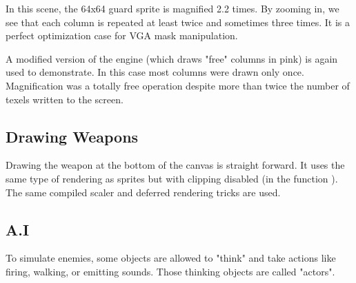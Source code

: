 \par
\begin{figure}[H]
 \centering
\end{figure}
In this scene, the 64x64 guard sprite is magnified 2.2 times. By zooming in, we see that each column is repeated at least twice and sometimes three times. It is a perfect optimization case for VGA mask manipulation.\\
\par
A modified version of the engine (which draws "free" columns in pink) is again used to demonstrate.  In this case most columns were drawn only once. Magnification was a totally free operation despite more than twice the number of texels written to the screen.\\

\par
\begin{figure}[H]
 \centering
\end{figure}
\begin{figure}[H]
 \centering
\end{figure}






\subsection{Drawing Weapons}
Drawing the weapon at the bottom of the canvas is straight forward. It uses the same type of rendering as sprites but with clipping disabled (in the function ). The same compiled scaler and deferred rendering tricks are used.














\subsection{A.I}
To simulate enemies, some objects are allowed to "think" and take actions like firing, walking, or emitting sounds. Those thinking objects are called "actors".\\
\par






